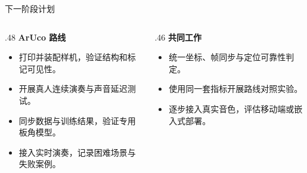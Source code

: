 \documentclass[aspectratio=169,11pt]{beamer}
\newcommand{\lead}[1]{{\color{FudanBlue}\bfseries #1}\par\vspace{.12cm}}
\newenvironment{points}{\begin{itemize}\setlength{\itemsep}{.45em}}{\end{itemize}}
\begin{document}
\begin{frame}[t]{下一阶段计划}
\begin{columns}[T,onlytextwidth]
\begin{column}{.48\textwidth}
\lead{ArUco 路线}
\begin{points}
\item 打印并装配样机，验证结构和标记可见性。
\item 开展真人连续演奏与声音延迟测试。
\end{points}
\vspace{.2cm}\lead{无标记路线}
\begin{points}
\item 同步数据与训练结果，验证专用板角模型。
\item 接入实时演奏，记录困难场景与失败案例。
\end{points}
\end{column}
\begin{column}{.46\textwidth}
\lead{共同工作}
\begin{points}
\item 统一坐标、帧同步与定位可靠性判定。
\item 使用同一套指标开展路线对照实验。
\item 逐步接入真实音色，评估移动端或嵌入式部署。
\end{points}
\end{column}
\end{columns}
\end{frame}
\end{document}
